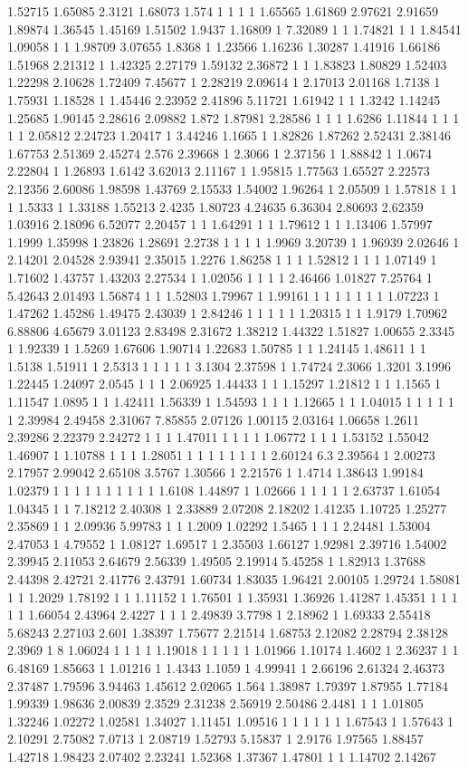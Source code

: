 1.52715 1.65085 2.3121 1.68073 1.574 1 1 1 1 1.65565 1.61869 2.97621 2.91659 1.89874 1.36545 1.45169 1.51502 1.9437 1.16809 1 7.32089 1 1 1.74821 1 1 1.84541 1.09058 1 1 1.98709 3.07655 1.8368 1 1.23566 1.16236 1.30287 1.41916 1.66186 1.51968 2.21312 1 1.42325 2.27179 1.59132 2.36872 1 1 1.83823 1.80829 1.52403 1.22298 2.10628 1.72409 7.45677 1 2.28219 2.09614 1 2.17013 2.01168 1.7138 1 1.75931 1.18528 1 1.45446 2.23952 2.41896 5.11721 1.61942 1 1 1.3242 1.14245 1.25685 1.90145 2.28616 2.09882 1.872 1.87981 2.28586 1 1 1 1.6286 1.11844 1 1 1 1 1 2.05812 2.24723 1.20417 1 3.44246 1.1665 1 1.82826 1.87262 2.52431 2.38146 1.67753 2.51369 2.45274 2.576 2.39668 1 2.3066 1 2.37156 1 1.88842 1 1.0674 2.22804 1 1.26893 1.6142 3.62013 2.11167 1 1.95815 1.77563 1.65527 2.22573 2.12356 2.60086 1.98598 1.43769 2.15533 1.54002 1.96264 1 2.05509 1 1.57818 1 1 1 1.5333 1 1.33188 1.55213 2.4235 1.80723 4.24635 6.36304 2.80693 2.62359 1.03916 2.18096 6.52077 2.20457 1 1 1.64291 1 1 1.79612 1 1 1.13406 1.57997 1.1999 1.35998 1.23826 1.28691 2.2738 1 1 1 1 1.9969 3.20739 1 1.96939 2.02646 1 2.14201 2.04528 2.93941 2.35015 1.2276 1.86258 1 1 1 1.52812 1 1 1 1.07149 1 1.71602 1.43757 1.43203 2.27534 1 1.02056 1 1 1 1 2.46466 1.01827 7.25764 1 5.42643 2.01493 1.56874 1 1 1.52803 1.79967 1 1.99161 1 1 1 1 1 1 1 1.07223 1 1.47262 1.45286 1.49475 2.43039 1 2.84246 1 1 1 1 1 1.20315 1 1 1.9179 1.70962 6.88806 4.65679 3.01123 2.83498 2.31672 1.38212 1.44322 1.51827 1.00655 2.3345 1 1.92339 1 1.5269 1.67606 1.90714 1.22683 1.50785 1 1 1.24145 1.48611 1 1 1.5138 1.51911 1 2.5313 1 1 1 1 1 3.1304 2.37598 1 1.74724 2.3066 1.3201 3.1996 1.22445 1.24097 2.0545 1 1 1 2.06925 1.44433 1 1 1.15297 1.21812 1 1 1.1565 1 1.11547 1.0895 1 1 1.42411 1.56339 1 1.54593 1 1 1 1.12665 1 1 1.04015 1 1 1 1 1 1 2.39984 2.49458 2.31067 7.85855 2.07126 1.00115 2.03164 1.06658 1.2611 2.39286 2.22379 2.24272 1 1 1 1.47011 1 1 1 1 1.06772 1 1 1 1.53152 1.55042 1.46907 1 1.10788 1 1 1 1.28051 1 1 1 1 1 1 1 1 2.60124 6.3 2.39564 1 2.00273 2.17957 2.99042 2.65108 3.5767 1.30566 1 2.21576 1 1.4714 1.38643 1.99184 1.02379 1 1 1 1 1 1 1 1 1 1 1.6108 1.44897 1 1.02666 1 1 1 1 1 2.63737 1.61054 1.04345 1 1 7.18212 2.40308 1 2.33889 2.07208 2.18202 1.41235 1.10725 1.25277 2.35869 1 1 2.09936 5.99783 1 1 1.2009 1.02292 1.5465 1 1 1 2.24481 1.53004 2.47053 1 4.79552 1 1.08127 1.69517 1 2.35503 1.66127 1.92981 2.39716 1.54002 2.39945 2.11053 2.64679 2.56339 1.49505 2.19914 5.45258 1 1.82913 1.37688 2.44398 2.42721 2.41776 2.43791 1.60734 1.83035 1.96421 2.00105 1.29724 1.58081 1 1 1.2029 1.78192 1 1 1.11152 1 1.76501 1 1.35931 1.36926 1.41287 1.45351 1 1 1 1 1 1.66054 2.43964 2.4227 1 1 1 2.49839 3.7798 1 2.18962 1 1.69333 2.55418 5.68243 2.27103 2.601 1.38397 1.75677 2.21514 1.68753 2.12082 2.28794 2.38128 2.3969 1 8 1.06024 1 1 1 1 1.19018 1 1 1 1 1 1.01966 1.10174 1.4602 1 2.36237 1 1 6.48169 1.85663 1 1.01216 1 1.4343 1.1059 1 4.99941 1 2.66196 2.61324 2.46373 2.37487 1.79596 3.94463 1.45612 2.02065 1.564 1.38987 1.79397 1.87955 1.77184 1.99339 1.98636 2.00839 2.3529 2.31238 2.56919 2.50486 2.4481 1 1 1.01805 1.32246 1.02272 1.02581 1.34027 1.11451 1.09516 1 1 1 1 1 1 1.67543 1 1.57643 1 2.10291 2.75082 7.0713 1 2.08719 1.52793 5.15837 1 2.9176 1.97565 1.88457 1.42718 1.98423 2.07402 2.23241 1.52368 1.37367 1.47801 1 1 1.14702 2.14267 
